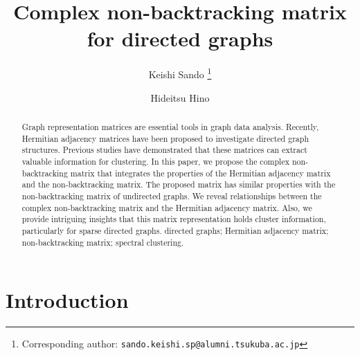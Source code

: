 \documentclass{article}
\theoremstyle{plain}
\begin{document}
\title{Complex non-backtracking matrix for directed graphs}

\author[1]{Keishi Sando%
	\thanks{Corresponding author: \texttt{sando.keishi.sp@alumni.tsukuba.ac.jp}}}

\author[2]{Hideitsu Hino}

\date{}

\maketitle


\begin{abstract}
	{Graph representation matrices are essential tools in graph data analysis. Recently, Hermitian adjacency matrices have been proposed to investigate directed graph structures. Previous studies have demonstrated that these matrices can extract valuable information for clustering. In this paper, we propose the complex non-backtracking matrix that integrates the properties of the Hermitian adjacency matrix and the non-backtracking matrix. The proposed matrix has similar properties with the non-backtracking matrix of undirected graphs. We reveal relationships between the complex non-backtracking matrix and the Hermitian adjacency matrix. Also, we provide intriguing insights that this matrix representation holds cluster information, particularly for sparse directed graphs.
	} %
	{directed graphs; Hermitian adjacency matrix; non-backtracking matrix; spectral clustering.} %
	\\
\end{abstract}


\section{Introduction}
\end{document}
